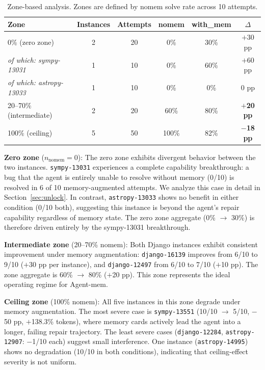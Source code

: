 \documentclass{article}
\begin{document}
\begin{table}[h]
\centering
\caption{Zone-based analysis. Zones are defined by nomem solve rate across 10 attempts.}
\label{tab:zone}
\begin{tabular}{lccccc}
\toprule
\textbf{Zone} & \textbf{Instances} & \textbf{Attempts} & \textbf{nomem} & \textbf{with\_mem} & \textbf{$\Delta$} \\
\midrule
0\% (zero zone) & 2 & 20 & 0\% & 30\% & $+$30 pp \\
\quad\textit{of which: sympy-13031} & 1 & 10 & 0\% & 60\% & $+$60 pp \\
\quad\textit{of which: astropy-13033} & 1 & 10 & 0\% & 0\% & 0 pp \\
\midrule
20--70\% (intermediate) & 2 & 20 & 60\% & 80\% & $\mathbf{+}$\textbf{20 pp} \\
\midrule
100\% (ceiling) & 5 & 50 & 100\% & 82\% & $\mathbf{-}$\textbf{18 pp} \\
\bottomrule
\end{tabular}
\end{table}

\textbf{Zero zone} ($n_{\text{nomem}}=0$): The zero zone exhibits divergent behavior between the two instances. \texttt{sympy-13031} experiences a complete capability breakthrough: a bug that the agent is entirely unable to resolve without memory (0/10) is resolved in 6 of 10 memory-augmented attempts. We analyze this case in detail in Section~\ref{sec:unlock}. In contrast, \texttt{astropy-13033} shows no benefit in either condition (0/10 both), suggesting this instance is beyond the agent's repair capability regardless of memory state. The zero zone aggregate (0\% $\to$ 30\%) is therefore driven entirely by the sympy-13031 breakthrough.

\textbf{Intermediate zone} (20--70\% nomem): Both Django instances exhibit consistent improvement under memory augmentation: \texttt{django-16139} improves from 6/10 to 9/10 ($+$30 pp per instance), and \texttt{django-12497} from 6/10 to 7/10 ($+$10 pp). The zone aggregate is 60\% $\to$ 80\% ($+$20 pp). This zone represents the ideal operating regime for Agent-mem.

\textbf{Ceiling zone} (100\% nomem): All five instances in this zone degrade under memory augmentation. The most severe case is \texttt{sympy-13551} (10/10 $\to$ 5/10, $-$50 pp, $+$138.3\% tokens), where memory cards actively lead the agent into a longer, failing repair trajectory. The least severe cases (\texttt{django-12284}, \texttt{astropy-12907}: $-$1/10 each) suggest small interference. One instance (\texttt{astropy-14995}) shows no degradation (10/10 in both conditions), indicating that ceiling-effect severity is not uniform.
\end{document}
